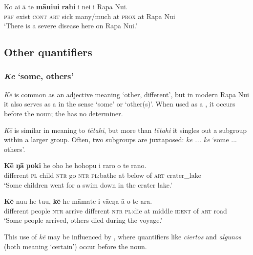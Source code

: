 \ea\label{ex:4.107}
\gll Ko ai {\ꞌ}ā te \textbf{māuiui} \textbf{rahi} {\ꞌ}i nei {\ꞌ}i Rapa Nui. \\
\textsc{prf} exist \textsc{cont} \textsc{art} sick many/much at \textsc{prox} at Rapa Nui \\

\glt 
‘There is a severe disease here on Rapa Nui.’ \textstyleExampleref{[R398.002]} 
\z
{}

\subsection{Other quantifiers}\label{sec:4.4.8}
\subsubsection{\textit{Kē} ‘some, others’}\label{sec:4.4.8.1}
\textit{Kē} is common as an adjective meaning ‘other, different’, but in modern Rapa Nui it also serves as a  in the sense ‘some’ or ‘other(s)’. When used as a , it occurs before the noun; the  has no determiner. 

\textit{Kē} is similar in meaning to \textit{tētahi}, but more than \textit{tētahi} it singles out a subgroup within a larger group. Often, two subgroups are juxtaposed: \textit{kē ... kē} ‘some ... others’. 

\ea\label{ex:4.108}
\gll \textbf{Kē} \textbf{ŋā} \textbf{poki} he oho he hohopu {\ꞌ}i raro o te rano. \\
different \textsc{pl} child \textsc{ntr} go \textsc{ntr} \textsc{pl}:bathe at below of \textsc{art} crater\_lake \\

\glt 
‘Some children went for a swim down in the crater lake.’ \textstyleExampleref{[R157.012]} 
\z

\ea\label{ex:4.109}
\gll \textbf{Kē} nu{\ꞌ}u he tu{\ꞌ}u, \textbf{kē} he māmate {\ꞌ}i vāeŋa {\ꞌ}ā o te ara. \\
different people \textsc{ntr} arrive different \textsc{ntr} \textsc{pl}:die at middle \textsc{ident} of \textsc{art} road \\

\glt
‘Some people arrived, others died during the voyage.’ \textstyleExampleref{[R303.002]} 
\z

This use of \textit{kē} may be influenced by , where quantifiers like \textit{ciertos} and \textit{algunos} (both meaning ‘certain’) occur before the noun.

